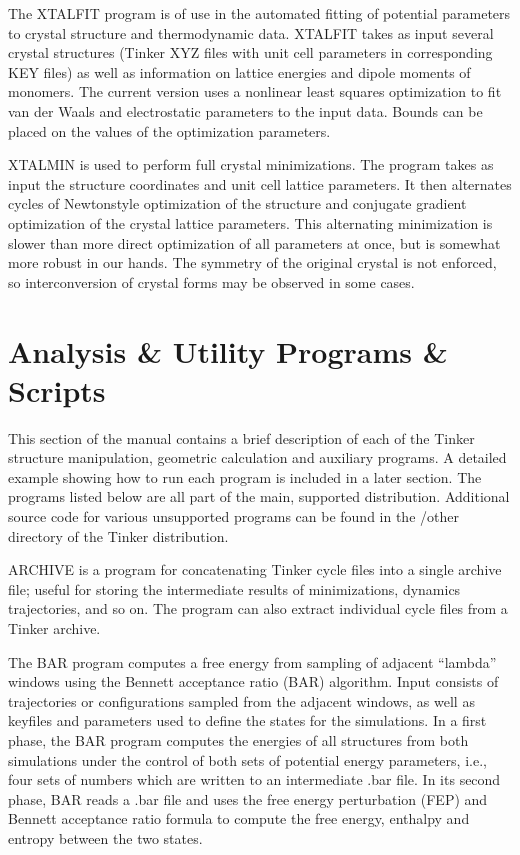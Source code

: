 \documentclass[letterpaper,11pt,english]{sphinxmanual}
\begin{document}
The XTALFIT program is of use in the automated fitting of potential parameters to crystal structure and thermodynamic data. XTALFIT takes as input several crystal structures (Tinker XYZ files with unit cell parameters in corresponding KEY files) as well as information on lattice energies and dipole moments of monomers. The current version uses a nonlinear least squares optimization to fit van der Waals and electrostatic parameters to the input data. Bounds can be placed on the values of the optimization parameters.


XTALMIN is used to perform full crystal minimizations. The program takes as input the structure coordinates and unit cell lattice parameters. It then alternates cycles of Newton\sphinxhyphen{}style optimization of the structure and conjugate gradient optimization of the crystal lattice parameters. This alternating minimization is slower than more direct optimization of all parameters at once, but is somewhat more robust in our hands. The symmetry of the original crystal is not enforced, so interconversion of crystal forms may be observed in some cases.


\chapter{Analysis \& Utility Programs \& Scripts}
\label{\detokenize{text/analysis-programs:analysis-utility-programs-scripts}}\label{\detokenize{text/analysis-programs::doc}}
This section of the manual contains a brief description of each of the Tinker structure manipulation, geometric calculation and auxiliary programs. A detailed example showing how to run each program is included in a later section. The programs listed below are all part of the main, supported distribution. Additional source code for various unsupported programs can be found in the /other directory of the Tinker distribution.


ARCHIVE is a program for concatenating Tinker cycle files into a single archive file; useful for storing the intermediate results of minimizations, dynamics trajectories, and so on. The program can also extract individual cycle files from a Tinker archive.


The BAR program computes a free energy from sampling of adjacent “lambda” windows using the Bennett acceptance ratio (BAR) algorithm. Input consists of trajectories or configurations sampled from the adjacent windows, as well as keyfiles and parameters used to define the states for the simulations. In a first phase, the BAR program computes the energies of all structures from both simulations under the control of both sets of potential energy parameters, i.e., four sets of numbers which are written to an intermediate .bar file. In its second phase, BAR reads a .bar file and uses the free energy perturbation (FEP) and Bennett acceptance ratio formula to compute the free energy, enthalpy and entropy between the two states.
\end{document}
